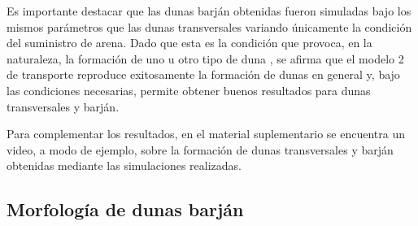 \documentclass[11pt,twocolumn,twoside]{opticajnl}
\begin{document}
Es importante destacar que las dunas barján obtenidas fueron simuladas bajo los mismos parámetros que las dunas transversales variando únicamente la condición del suministro de arena. Dado que esta es la condición que provoca, en la naturaleza, la formación de uno u otro tipo de duna \cite{bullard_wasson_2010}, se afirma que el modelo 2 de transporte reproduce exitosamente la formación de dunas en general y, bajo las condiciones necesarias, permite obtener buenos resultados para dunas transversales y barján. 

Para complementar los resultados, en el material suplementario \cite{link} se encuentra un video, a modo de ejemplo, sobre la formación de dunas transversales y barján obtenidas mediante las simulaciones realizadas. 

\subsection{Morfología de dunas barján\label{sec:morfologia}}
\end{document}
